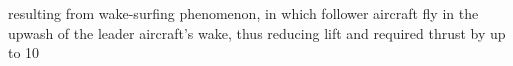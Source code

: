 resulting from wake-surfing phenomenon, in which follower aircraft fly in the upwash of the leader aircraft's wake, thus reducing lift and required thrust by up to 10~%